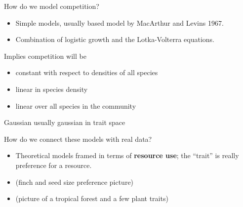 \documentclass[12pt]{beamer}
\begin{document}
\begin{frame}{How do we model competition?}

  \begin{itemize}
  \item Simple models, usually based model by MacArthur and Levins 1967.
  \item Combination of logistic growth and the Lotka-Volterra
    equations.
  \end{itemize}

  Implies competition will be
  \begin{itemize}
  \item constant with respect to densities of all species
  \item linear in species density
  \item linear over all species in the community
  \end{itemize}
  Gaussian usually gaussian in trait space
\end{frame}

\begin{frame}{How do we connect these models with real data?}

  \begin{itemize}
  \item Theoretical models framed in terms of \textbf{resource use};
    the ``trait'' is really preference for a resource.
  \item (finch and seed size preference picture)
  \item (picture of a tropical forest and a few plant traits)
  \end{itemize}
\end{frame}
\end{document}
